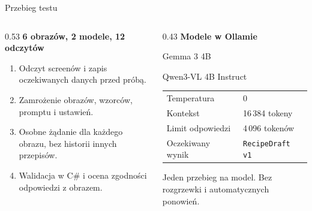 \documentclass[aspectratio=169,11pt]{beamer}
\newcommand{\modelgemma}{Gemma 3 4B}
\newcommand{\modelqwen}{Qwen3-VL 4B Instruct}
\begin{document}
\begin{frame}{Przebieg testu}
  \begin{columns}[T,onlytextwidth]
    \begin{column}{0.53\textwidth}
      \textbf{6 obrazów, 2 modele, 12 odczytów}
      \begin{enumerate}
        \setlength{\itemsep}{0.16cm}
        \item Odczyt screenów i zapis oczekiwanych danych przed próbą.
        \item Zamrożenie obrazów, wzorców, promptu i ustawień.
        \item Osobne żądanie dla każdego obrazu, bez historii innych przepisów.
        \item Walidacja w C\# i ocena zgodności odpowiedzi z obrazem.
      \end{enumerate}
    \end{column}
    \begin{column}{0.43\textwidth}
      \textbf{Modele w Ollamie}
      \par\modelgemma
      \par\modelqwen
      \vspace{0.18cm}

      {\small
      \begin{tabular}{@{}ll@{}}
        Temperatura & 0 \\
        Kontekst & 16\,384 tokeny \\
        Limit odpowiedzi & 4\,096 tokenów \\
        Oczekiwany wynik & \texttt{RecipeDraft v1}
      \end{tabular}\par}
      \vspace{0.15cm}
      {\small Jeden przebieg na model. Bez rozgrzewki i automatycznych ponowień.}
    \end{column}
  \end{columns}
\end{frame}
\end{document}
